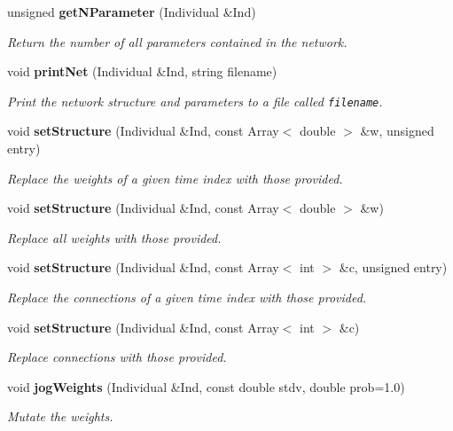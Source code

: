 \begin{CompactItemize}
unsigned {\bf get\-NParameter} (Individual \&Ind)
\begin{CompactList}\small\item\em Return the number of all parameters contained in the network.\item\end{CompactList}\item 
{}
void {\bf print\-Net} (Individual \&Ind, string filename)\label{classOps__Basic_a11}

\begin{CompactList}\small\item\em Print the network structure and parameters to a file called {\tt filename}.\item\end{CompactList}\item 
void {\bf set\-Structure} (Individual \&Ind, const Array$<$ double $>$ \&w, unsigned entry)
\begin{CompactList}\small\item\em Replace the weights of a given time index with those provided.\item\end{CompactList}\item 
void {\bf set\-Structure} (Individual \&Ind, const Array$<$ double $>$ \&w)
\begin{CompactList}\small\item\em Replace all weights with those provided.\item\end{CompactList}\item 
void {\bf set\-Structure} (Individual \&Ind, const Array$<$ int $>$ \&c, unsigned entry)
\begin{CompactList}\small\item\em Replace the connections of a given time index with those provided.\item\end{CompactList}\item 
void {\bf set\-Structure} (Individual \&Ind, const Array$<$ int $>$ \&c)
\begin{CompactList}\small\item\em Replace connections with those provided.\item\end{CompactList}\item 
void {\bf jog\-Weights} (Individual \&Ind, const double stdv, double prob=1.0)
\begin{CompactList}\small\item\em Mutate the weights.\item\end{CompactList}\end{CompactItemize}
